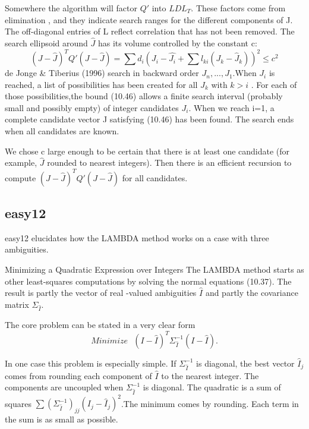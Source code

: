 Somewhere the algorithm will factor $Q'$ into $LDL_{T}$. These factors come from elimination , and they indicate search ranges for the different components of J. The off-diagonal entries of L reflect correlation that has not been removed. The search ellipsoid around $\hat{J}$ has its volume controlled by the constant c:
\begin{equation}
(J-\hat{J})^{T}Q'(J-\hat{J})=\sum d_{i}(J_{i}-\hat{J_{i}}+\sum l_{ki}(J_{k}-\hat{J}_{k}))^{2}\leq c^{2}
\end{equation}
de Jonge \& Tiberius (1996) search in backward order $J_{n},...,J_{1}$.When $J_{i}$ is reached, a list of possibilities has been created for all $J_{k}$ with $k > i$ . For each of those possibilities,the bound (10.46) allows a finite search interval (probably small and possibly empty) of integer candidates $J_{i}$. When we reach i=1, a complete candidate vector J satisfying (10.46) has been found. The search ends when all candidates are known.

We chose c large enough to be certain that there is at least one candidate (for example,
$\hat{J}$ rounded to nearest integers). Then there is an efficient recursion to compute $(J-\hat{J})^{T}Q'(J-\hat{J})$ for all candidates.

\subsection{easy12}

easy12 elucidates how the LAMBDA method works on a case with three ambiguities.

Minimizing a Quadratic Expression over Integers The LAMBDA method starts as other
least-squares computations by solving the normal equations (10.37). The result is partly  the vector of real -valued ambiguities $\hat{I}$ and partly the covariance matrix $\Sigma_{\hat{I}}$.

The core problem can be stated in a very clear form
\begin{equation}
Minimize\,\,\,\,(I-\hat{I})^{T}\Sigma_{\hat{I}}^{-1}(I-\hat{I}).
\end{equation}

In one case this problem is especially simple. If $\Sigma_{\hat{I}}^{-1}$ is diagonal, the best vector $\hat{I}_{j}$ comes from rounding each component of $\hat{I}$ to the nearest integer. The components are uncoupled when $\Sigma_{\hat{I}}^{-1}$ is diagonal. The quadratic is a sum of squares $\sum(\Sigma_{\hat{I}}^{-1})_{jj}(I_{j}-\hat{I}_{j})^{2}$.The minimum comes by rounding. Each term in the sum is as small as possible.

